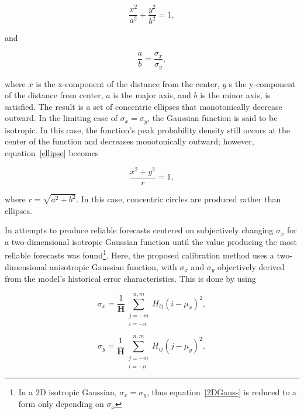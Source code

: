     \begin{equation}
        \label{ellipse}
        \frac{x^2}{a^2} + \frac{y^2}{b^2} = 1,
    \end{equation}

\noindent and

    \begin{equation}
        \frac{a}{b} = \frac{\sigma_x}{\sigma_y},
    \end{equation}

\noindent where $x$ is the x-component of the distance from the center, $y$ s the y-component of the distance from center, $a$ is the major axis, and $b$ is the minor axis, is satisfied.
The result is a set of concentric ellipses that monotonically decrease outward.
In the limiting case of $\sigma_x = \sigma_y$, the Gaussian function is said to be isotropic.
In this case, the function's peak probability density still occurs at the center of the function and decreases monotonically outward; however, \mbox{equation \ref{ellipse}} becomes

    \begin{equation}
        \frac{x^2 + y^2}{r} = 1,
    \end{equation}

\noindent where $r = \sqrt{a^2 + b^2}$.
In this case, concentric circles are produced rather than ellipses.

In \cite{Sobash2011} attempts to produce reliable forecasts centered on subjectively changing $\sigma_x$ for a two-dimensional isotropic Gaussian function until the value producing the most reliable forecasts was found\footnote{In a 2D isotropic Gaussian, $\sigma_x = \sigma_y$, thus \mbox{equation \ref{2DGauss}} is reduced to a form only depending on $\sigma_x$}.
Here, the proposed calibration method uses a two-dimensional anisotropic Gaussian function, with $\sigma_x$ and $\sigma_y$ objectively derived from the model's historical error characteristics.
This is done by using

    \begin{equation}
        \label{sigmax}
        \sigma_x = \frac{1}{\mathbf{H}} \sum\limits_{\substack{j=-m \\ i=-n}}^{n,m}H_{ij}(i - \mu_x)^2,
    \end{equation}

    \begin{equation}
        \label{sigmay}
        \sigma_y = \frac{1}{\mathbf{H}} \sum\limits_{\substack{j=-m \\ i=-n}}^{n,m}H_{ij}(j - \mu_y)^2,
    \end{equation}


